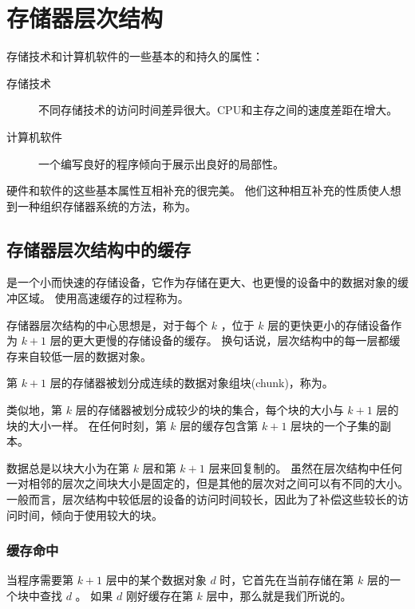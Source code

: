 
\section{存储器层次结构}
{
    存储技术和计算机软件的一些基本的和持久的属性：

    \begin{description}
        \item[存储技术] 不同存储技术的访问时间差异很大。CPU和主存之间的速度差距在增大。
        \item[计算机软件] 一个编写良好的程序倾向于展示出良好的局部性。
    \end{description}

    硬件和软件的这些基本属性互相补充的很完美。
    他们这种相互补充的性质使人想到一种组织存储器系统的方法，称为。

    \subsection{存储器层次结构中的缓存}
    {
        是一个小而快速的存储设备，它作为存储在更大、也更慢的设备中的数据对象的缓冲区域。
        使用高速缓存的过程称为。

        存储器层次结构的中心思想是，对于每个 $k$ ，位于 $k$ 层的更快更小的存储设备作为 $k + 1$ 层的更大更慢的存储设备的缓存。
        换句话说，层次结构中的每一层都缓存来自较低一层的数据对象。

        第 $k + 1$ 层的存储器被划分成连续的数据对象组块(chunk)，称为。

        类似地，第 $k$ 层的存储器被划分成较少的块的集合，每个块的大小与 $k + 1$ 层的块的大小一样。
        在任何时刻，第 $k$ 层的缓存包含第 $k + 1$ 层块的一个子集的副本。

        数据总是以块大小为在第 $k$ 层和第 $k + 1$ 层来回复制的。
        虽然在层次结构中任何一对相邻的层次之间块大小是固定的，但是其他的层次对之间可以有不同的大小。
        一般而言，层次结构中较低层的设备的访问时间较长，因此为了补偿这些较长的访问时间，倾向于使用较大的块。

        \subsubsection{缓存命中}
        {
            当程序需要第 $k + 1$ 层中的某个数据对象 $d$ 时，它首先在当前存储在第 $k$ 层的一个块中查找 $d$ 。
            如果 $d$ 刚好缓存在第 $k$ 层中，那么就是我们所说的。
        }

}}
